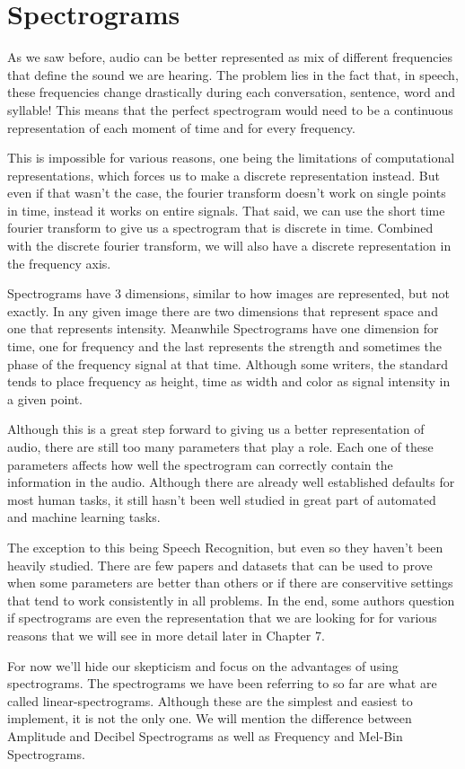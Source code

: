 \documentclass{book}
\begin{document}
\chapter{Spectrograms}

\qquad As we saw before, audio can be better represented as mix of different frequencies that define the sound we are hearing. The problem lies in the fact that, in speech, these frequencies change drastically during each conversation, sentence, word and syllable! This means that the perfect spectrogram would need to be a continuous representation of each moment of time and for every frequency.
\par
This is impossible for various reasons, one being the limitations of computational representations, which forces us to make a discrete representation instead. But even if that wasn’t the case, the fourier transform doesn’t work on single points in time, instead it works on entire signals. That said, we can use the short time fourier transform to give us a spectrogram that is discrete in time. Combined with the discrete fourier transform, we will also have a discrete representation in the frequency axis.
\par
Spectrograms have 3 dimensions, similar to how images are represented, but not exactly. In any given image there are two dimensions that represent space and one that represents intensity. Meanwhile Spectrograms have one dimension for time, one for frequency and the last represents the strength and sometimes the phase of the frequency signal at that time. Although some writers, the standard tends to place frequency as height, time as width and color as signal intensity in a given point.
\par
Although this is a great step forward to giving us a better representation of audio, there are still too many parameters that play a role. Each one of these parameters affects how well the spectrogram can correctly contain the information in the audio. Although there are already well established defaults for most human tasks, it still hasn’t been well studied in great part of automated and machine learning tasks.
\par
The exception to this being Speech Recognition, but even so they haven’t been heavily studied. There are few papers and datasets that can be used to prove when some parameters are better than others or if there are conservitive settings that tend to work consistently in all problems. In the end, some authors question if spectrograms are even the representation that we are looking for for various reasons that we will see in more detail later in Chapter 7.
\par
For now we'll hide our skepticism and focus on the advantages of using spectrograms. The spectrograms we have been referring to so far are what are called linear-spectrograms. Although these are the simplest and easiest to implement, it is not the only one. We will mention the difference between Amplitude and Decibel Spectrograms as well as Frequency and Mel-Bin Spectrograms.
\end{document}
